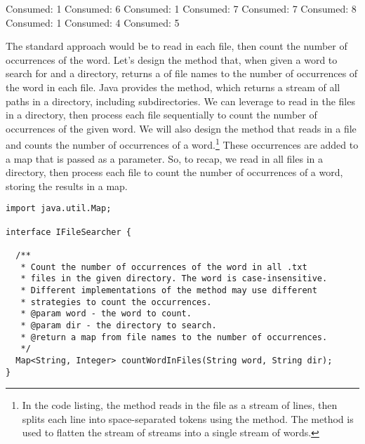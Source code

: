 \begin{verbnobox}[\small]
Consumed: 1
Consumed: 6
Consumed: 1
Consumed: 7
Consumed: 7
Consumed: 8
Consumed: 1
Consumed: 4
Consumed: 5
\end{verbnobox}

The standard approach would be to read in each file, then count the number of occurrences of the word. 
Let's design the  method that, when given a word to search for and a directory, returns a  of file names to the number of occurrences of the word in each file.
Java provides the  method, which returns a stream of all paths in a directory, including subdirectories.
We can leverage  to read in the  files in a directory, then process each file sequentially to count the number of occurrences of the given word.
We will also design the  method that reads in a file and counts the number of occurrences of a word.\footnote{In the code listing, the  method reads in the file as a stream of lines, then splits each line into space-separated tokens using the  method. The  method is used to flatten the stream of streams into a single stream of words.}
These occurrences are added to a map that is passed as a parameter.
So, to recap, we read in all  files in a directory, then process each file to count the number of occurrences of a word, storing the results in a map.

\begin{lstlisting}[language=MyJava]
import java.util.Map;

interface IFileSearcher {

  /**
   * Count the number of occurrences of the word in all .txt
   * files in the given directory. The word is case-insensitive.
   * Different implementations of the method may use different
   * strategies to count the occurrences.
   * @param word - the word to count.
   * @param dir - the directory to search.
   * @return a map from file names to the number of occurrences.
   */
  Map<String, Integer> countWordInFiles(String word, String dir);
}
\end{lstlisting}

